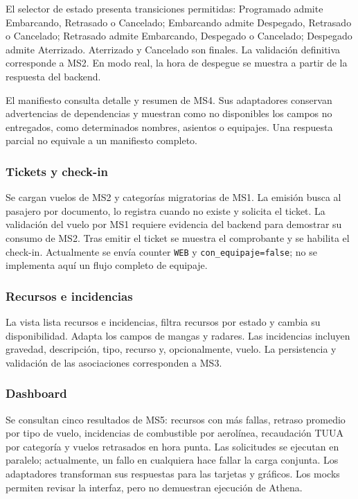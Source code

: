 El selector de estado presenta transiciones permitidas: Programado admite
Embarcando, Retrasado o Cancelado; Embarcando admite Despegado, Retrasado o Cancelado;
Retrasado admite Embarcando, Despegado o Cancelado; Despegado admite Aterrizado.
Aterrizado y Cancelado son finales. La validación definitiva corresponde a MS2.
En modo real, la hora de despegue se muestra a partir de la respuesta del backend.

El manifiesto consulta detalle y resumen de MS4. Sus adaptadores conservan
advertencias de dependencias y muestran como no disponibles los campos
no entregados, como determinados nombres, asientos o equipajes.
Una respuesta parcial no equivale a un manifiesto completo.

\subsubsection{Tickets y check-in}
Se cargan vuelos de MS2 y categorías migratorias de MS1. La emisión busca
al pasajero por documento, lo registra cuando no existe y solicita el ticket.
La validación del vuelo por MS1 requiere evidencia del backend para demostrar
su consumo de MS2. Tras emitir el ticket se muestra el comprobante y se habilita
el check-in. Actualmente se envía counter \texttt{WEB} y
\texttt{con\_equipaje=false}; no se implementa aquí un flujo completo de equipaje.

\subsubsection{Recursos e incidencias}
La vista lista recursos e incidencias, filtra recursos por estado y cambia
su disponibilidad. Adapta los campos de mangas y radares. Las incidencias
incluyen gravedad, descripción, tipo, recurso y, opcionalmente, vuelo.
La persistencia y validación de las asociaciones corresponden a MS3.

\subsubsection{Dashboard}
Se consultan cinco resultados de MS5: recursos con más fallas, retraso promedio
por tipo de vuelo, incidencias de combustible por aerolínea, recaudación TUUA
por categoría y vuelos retrasados en hora punta.
Las solicitudes se ejecutan en paralelo; actualmente, un fallo en cualquiera
hace fallar la carga conjunta. Los adaptadores transforman sus respuestas
para las tarjetas y gráficos. Los mocks permiten revisar la interfaz, pero
no demuestran ejecución de Athena.


